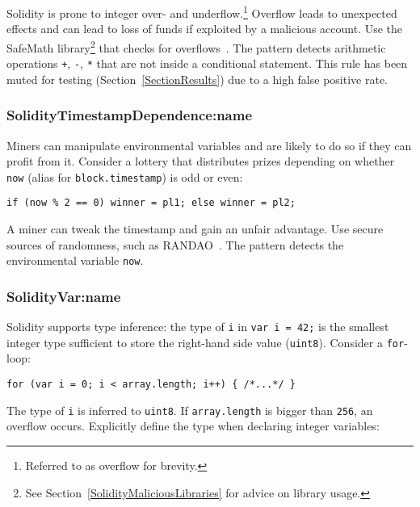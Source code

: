 Solidity is prone to integer over- and underflow.\footnote{Referred to as overflow for brevity.}
Overflow leads to unexpected effects and can lead to loss of funds if exploited by a malicious account.
Use the SafeMath library\footnote{See Section~\ref{SolidityMaliciousLibraries} for advice on library usage.} that checks for overflows~\cite{OpenZeppelin2017}.
The pattern detects arithmetic operations \texttt{+}, \texttt{-}, \texttt{*} that are not inside a conditional statement.
This rule has been muted for testing (Section~\ref{SectionResults}) due to a high false positive rate.


\subsubsection{\let\letcs\texapiletcs \usevalue SolidityTimestampDependence:name \let\letcs\etoolboxletcs} \label{SolidityTimestampDependence}

Miners can manipulate environmental variables and are likely to do so if they can profit from it.
Consider a lottery that distributes prizes depending on whether \texttt{now} (alias for \texttt{block.timestamp}) is odd or even:

\begin{lstlisting}[language=Solidity]
	if (now % 2 == 0) winner = pl1; else winner = pl2;
\end{lstlisting}

A miner can tweak the timestamp and gain an unfair advantage.
Use secure sources of randomness, such as RANDAO~\cite{RANDAO2017}.
The pattern detects the environmental variable \texttt{now}.

\subsubsection{\let\letcs\texapiletcs \usevalue SolidityVar:name \let\letcs\etoolboxletcs} \label{SolidityVar}

Solidity supports type inference: the type of \texttt{i} in \texttt{var i = 42;} is the smallest integer type sufficient to store the right-hand side value (\texttt{uint8}).
Consider a \texttt{for}-loop:

\begin{lstlisting}[language=Solidity]
for (var i = 0; i < array.length; i++) { /*...*/ }
\end{lstlisting}

The type of \texttt{i} is inferred to \texttt{uint8}.
If \texttt{array.length} is bigger than \texttt{256}, an overflow occurs.
Explicitly define the type when declaring integer variables:

